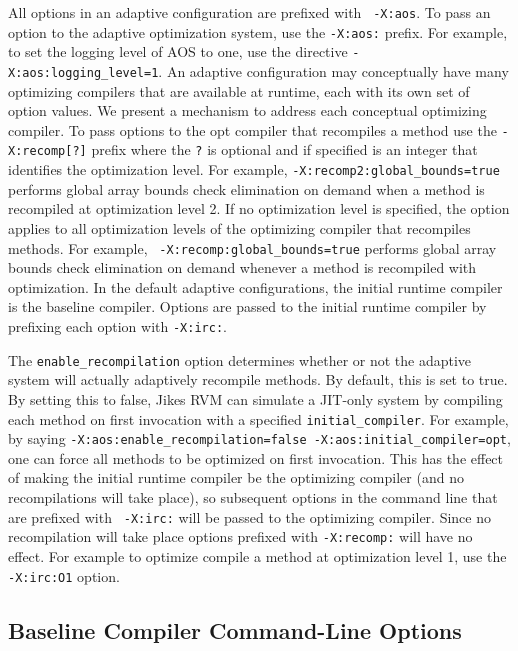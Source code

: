 All options in an adaptive configuration are prefixed with {\tt
-X:aos}.  To pass an option to the adaptive optimization system, use
the {\tt -X:aos:} prefix.  For example, to set the logging level of
AOS to one, use the directive {\tt -X:aos:logging\_level=1}. An
adaptive configuration may conceptually have many optimizing compilers
that are available at runtime, each with its own set of option values.
We present a mechanism to address each conceptual optimizing compiler.
To pass options to the opt compiler that recompiles a method use the
{\tt -X:recomp[?]} prefix where the {\tt ?} is optional and if
specified is an integer that identifies the optimization level.  For
example, {\tt -X:recomp2:global\_bounds=true} performs global array
bounds check elimination on demand when a method is recompiled at
optimization level 2.  If no optimization level is specified, the
option applies to all optimization levels of the optimizing compiler
that recompiles methods.  For example, {\tt
-X:recomp:global\_bounds=true} performs global array bounds check
elimination on demand whenever a method is recompiled with
optimization.  In the default adaptive configurations, the initial
runtime compiler is the baseline compiler.  Options are passed to the
initial runtime compiler by prefixing each option with {\tt -X:irc:}.  

The {\tt enable\_recompilation} option determines whether or not the
adaptive system will actually adaptively recompile methods.  By
default, this is set to true. By setting this to false, Jikes RVM can
simulate a JIT-only system by compiling each method on first
invocation with a specified {\tt initial\_compiler}. For example, 
by saying {\tt -X:aos:enable\_recompilation=false
-X:aos:initial\_compiler=opt}, one can force all methods to be
optimized on first invocation. 
This has the effect of making the initial runtime compiler
be the optimizing compiler (and no recompilations will take place), so
subsequent options in the command line that are prefixed with {\tt
-X:irc:} will be passed to the optimizing compiler. Since no
recompilation will take place options prefixed with {\tt -X:recomp:}
will have no effect.  For example to optimize compile a method at
optimization level 1, use the {\tt -X:irc:O1} option. 

\subsection{Baseline Compiler Command-Line Options}
\label{section:nonadaptive:baseline:options}

